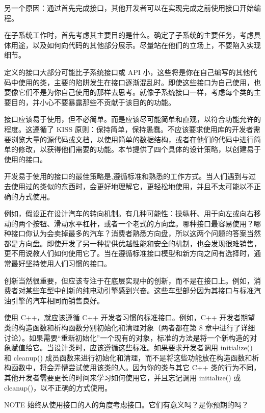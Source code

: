 另一个原因：通过首先完成接口，其他开发者可以在实现完成之前使用接口开始编程。

在子系统工作时，首先考虑其主要目的是什么。确定了子系统的主要任务，考虑具体用途，以及如何向代码的其他部分展示。尽量站在他们的立场上，不要陷入实现细节。


定义的接口大部分可能比子系统接口或 API 小，这些将是你在自己编写的其他代码中使用的类，主要的陷阱发生在接口逐渐混乱时。即使这些接口为自己使用，也要像它们不是为你自己使用的那样去思考。就像子系统接口一样，考虑每个类的主要目的，并小心不要暴露那些不贡献于该目的的功能。


接口应该易于使用，但不必简单。而是应该尽可能简单和直观，以符合功能允许的程度。这遵循了 KISS 原则：保持简单，保持愚蠢。不应该要求使用库的开发者需要浏览大量的源代码或文档，以使用简单的数据结构，或者在他们的代码中进行简单的修改，以获得他们需要的功能。本节提供了四个具体的设计策略，以创建易于使用的接口。


开发易于使用的接口的最佳策略是,遵循标准和熟悉的工作方式。当人们遇到与过去使用过的类似的东西时，会更好地理解它，更轻松地使用，并且不太可能以不正确的方式使用。

例如，假设正在设计汽车的转向机制。有几种可能性：操纵杆、用于向左或向右移动的两个按钮、滑动水平杠杆，或者一个老式的方向盘。哪种接口最容易使用？哪种接口你认为会卖掉最多的汽车？消费者熟悉方向盘，所以这两个问题的答案当然都是方向盘。即使开发了另一种提供优越性能和安全的机制，也会发现很难销售，更不用说教人们如何使用它了。当在遵循标准接口模型和新方向之间有选择时，通常最好坚持使用人们习惯的接口。

创新当然很重要，但应该专注于在底层实现中的创新，而不是在接口上。例如，消费者对某些车型中创新的纯电动引擎感到兴奋。这些车型部分因为其接口与标准汽油引擎的汽车相同而销售良好。

使用 C++，就应该遵循 C++ 开发者习惯的标准接口。例如，C++ 开发者期望类的构造函数和析构函数分别初始化和清理对象（两者都在第 8 章中进行了详细讨论）。如果需要“重新初始化”一个现有的对象，标准的方法是将一个新构造的对象赋值给它。当设计类时，应该遵循这些标准。如果要求开发者调用 initialize() 和 cleanup() 成员函数来进行初始化和清理，而不是将这些功能放在构造函数和析构函数中，将会弄懵尝试使用该类的人。因为你的类与其它 C++ 类的行为不同，其他开发者需要更长的时间来学习如何使用它，并且忘记调用 initialize() 或 cleanup()，以不正确的方式使用。

\begin{myNotic}{NOTE}
始终从使用接口的人的角度考虑接口。它们有意义吗？是你预期的吗？
\end{myNotic}

